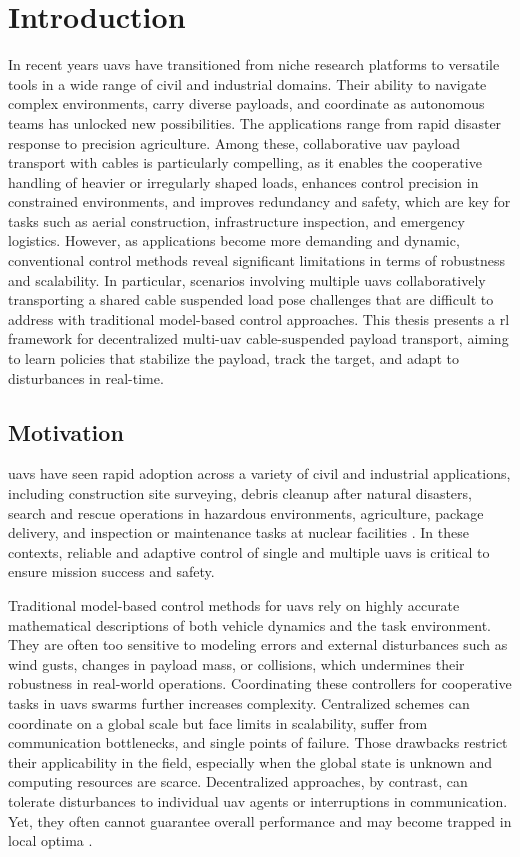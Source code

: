 \chapter{Introduction}
\glsresetall
In recent years \glspl{uav} have transitioned from niche research platforms to versatile tools in a wide range of civil and industrial domains. Their ability to navigate complex environments, carry diverse payloads, and coordinate as autonomous teams has unlocked new possibilities. The applications range from rapid disaster response to precision agriculture. Among these, collaborative \gls{uav} payload transport with cables is particularly compelling, as it enables the cooperative handling of heavier or irregularly shaped loads, enhances control precision in constrained environments, and improves redundancy and safety, which are key for tasks such as aerial construction, infrastructure inspection, and emergency logistics. However, as applications become more demanding and dynamic, conventional control methods reveal significant limitations in terms of robustness and scalability. In particular, scenarios involving multiple \glspl{uav} collaboratively transporting a shared cable suspended load pose challenges that are difficult to address with traditional model-based control approaches.
This thesis presents a \gls{rl} framework for decentralized multi-\gls{uav} cable-suspended payload transport, aiming to learn policies that stabilize the payload, track the target, and adapt to disturbances in real-time.

\section{Motivation}
\glspl{uav} have seen rapid adoption across a variety of civil and industrial applications, including construction site surveying, debris cleanup after natural disasters, search and rescue operations in hazardous environments, agriculture, package delivery, and inspection or maintenance tasks at nuclear facilities \autocite{Idrissi2022AROA,Lyu2023UnmannedAVA,Chen2021FromUSA,Abbaraju2018SensingASA}. In these contexts, reliable and adaptive control of single and multiple \glspl{uav} is critical to ensure mission success and safety.

Traditional model-based control methods for \glspl{uav} rely on highly accurate mathematical descriptions of both vehicle dynamics and the task environment. They are often too sensitive to modeling errors and external disturbances such as wind gusts, changes in payload mass, or collisions, which undermines their robustness in real-world operations. Coordinating these controllers for cooperative tasks in \glspl{uav} swarms further increases complexity. Centralized schemes can coordinate on a global scale but face limits in scalability, suffer from communication bottlenecks, and single points of failure. Those drawbacks restrict their applicability in the field, especially when the global state is unknown and computing resources are scarce. Decentralized approaches, by contrast, can tolerate disturbances to individual \gls{uav} agents or interruptions in communication. Yet, they often cannot guarantee overall performance and may become trapped in local optima \autocite{batra_decentralized_2022, Zhou2020EGOSwarmAF}.

